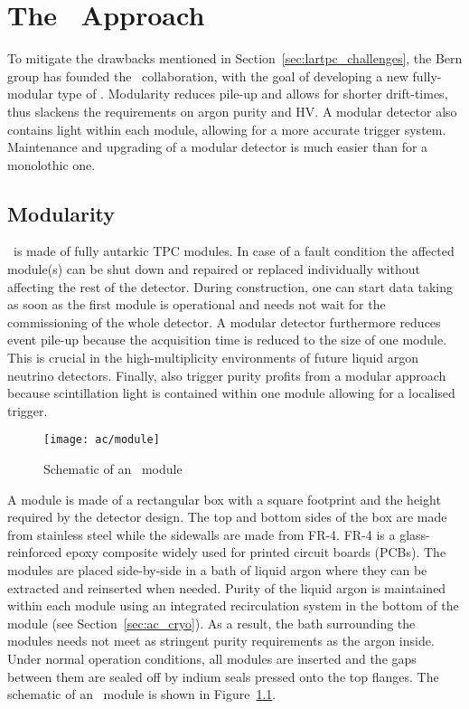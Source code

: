 \chapter{The \AC\ Approach}
\label{chap:argoncube}

To mitigate the drawbacks mentioned in Section~\ref{sec:lartpc_challenges}, the Bern group has founded the \AC\ collaboration, with the goal of developing a new fully-modular type of \lartpc.
Modularity reduces pile-up and allows for shorter drift-times, thus slackens the requirements on argon purity and HV.
A modular detector also contains light within each module, allowing for a more accurate trigger system.
Maintenance and upgrading of a modular detector is much easier than for a monolothic one.


\section{Modularity}
\label{sec:ac_modularity}

\AC\ is made of fully autarkic TPC modules.
In case of a fault condition the affected module(s) can be shut down and repaired or replaced individually without affecting the rest of the detector.
During construction, one can start data taking as soon as the first module is operational and needs not wait for the commissioning of the whole detector.
A modular detector furthermore reduces event pile-up because the acquisition time is reduced to the size of one module.
This is crucial in the high-multiplicity environments of future liquid argon neutrino detectors.
Finally, also trigger purity profits from a modular approach because scintillation light is contained within one module allowing for a localised trigger.

\begin{figure}[htb]
	\centering
	\texttt{[image: ac/module]}
	\caption{Schematic of an \AC\ module}
	\label{fig:ac_module}
\end{figure}

A module is made of a rectangular box with a square footprint and the height required by the detector design.
The top and bottom sides of the box are made from stainless steel while the sidewalls are made from FR-4.
FR-4 is a glass-reinforced epoxy composite widely used for printed circuit boards (PCBs).
The modules are placed side-by-side in a bath of liquid argon where they can be extracted and reinserted when needed.
Purity of the liquid argon is maintained within each module using an integrated recirculation system in the bottom of the module (see Section~\ref{sec:ac_cryo}).
As a result, the bath surrounding the modules needs not meet as stringent purity requirements as the argon inside.
Under normal operation conditions, all modules are inserted and the gaps between them are sealed off by indium seals pressed onto the top flanges.
The schematic of an \AC\ module is shown in Figure~\ref{fig:ac_module}.

